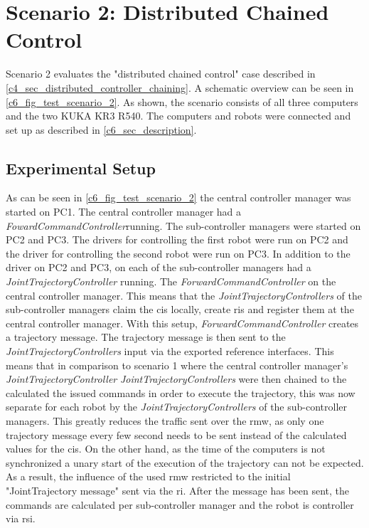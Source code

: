 \section{Scenario 2: Distributed Chained Control}
Scenario 2 evaluates the "distributed chained control" case described in \autoref{c4_sec_distributed_controller_chaining}. A schematic overview can be seen in \autoref{c6_fig_test_scenario_2}. As shown, the scenario consists of all three computers and the two KUKA KR3 R540. The computers and robots were connected and set up as described in \autoref{c6_sec_description}.

\subsection{Experimental Setup}
As can be seen in \autoref{c6_fig_test_scenario_2} the central controller manager was started on PC1. The central controller manager had a \textit{FowardCommandController}running. The sub-controller managers were started on PC2 and PC3. The drivers for controlling the first robot were run on PC2 and the driver for controlling the second robot were run on PC3. In addition to the driver on PC2 and PC3, on each of the sub-controller managers had a \textit{JointTrajectoryController} running. The \textit{ForwardCommandController} on the central controller manager. This means that the \textit{JointTrajectoryControllers} of the sub-controller managers claim the \glspl{ci} locally, create \glspl{ri} and register them at the central controller manager. With this setup, \textit{ForwardCommandController} creates a trajectory message. The trajectory message is then sent to the \textit{JointTrajectoryControllers} input via the exported reference interfaces. This means that in comparison to scenario 1 where the central controller manager's \textit{JointTrajectoryController} \textit{JointTrajectoryControllers} were then chained to the calculated the issued commands in order to execute the trajectory, this was now separate for each robot by the \textit{JointTrajectoryControllers} of the sub-controller managers. This greatly reduces the traffic sent over the \gls{rmw}, as only one trajectory message every few second needs to be sent instead of the calculated values for the \glspl{ci}. On the other hand, as the time of the computers is not synchronized a unary start of the execution of the trajectory can not be expected. As a result, the influence of the used \gls{rmw} restricted to the initial "JointTrajectory message" sent via the \gls{ri}. After the message has been sent, the commands are calculated per sub-controller manager and the robot is controller via \gls{rsi}. \newline
